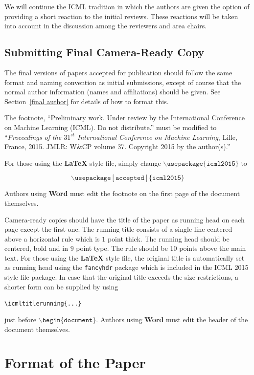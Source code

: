 \documentclass{article}
\begin{document}
We will continue the ICML tradition in which the authors are given the
option of providing a short reaction to the initial reviews. These
reactions will be taken into account in the discussion among the
reviewers and area chairs.

\subsection{Submitting Final Camera-Ready Copy}

The final versions of papers accepted for publication should follow the
same format and naming convention as initial submissions, except of
course that the normal author information (names and affiliations)
should be given.  See Section~\ref{final author} for details of how to
format this.

The footnote, ``Preliminary work.  Under review by the International
Conference on Machine Learning (ICML).  Do not distribute.'' must be
modified to ``\textit{Proceedings of the
$\mathit{31}^{st}$ International Conference on Machine Learning},
Lille, France, 2015.  JMLR: W\&CP volume 37. 
Copyright 2015 by the author(s).''

For those using the \textbf{\LaTeX} style file, simply change
$\mathtt{\backslash usepackage\{icml2015\}}$ to 

$$\mathtt{\backslash usepackage[accepted]\{icml2015\}}$$

\noindent
Authors using \textbf{Word} must edit the
footnote on the first page of the document themselves.

Camera-ready copies should have the title of the paper as running head
on each page except the first one.  The running title consists of a
single line centered above a horizontal rule which is $1$ point thick.
The running head should be centered, bold and in $9$ point type.  The
rule should be $10$ points above the main text.  For those using the
\textbf{\LaTeX} style file, the original title is automatically set as running
head using the {\tt fancyhdr} package which is included in the ICML
2015 style file package.  In case that the original title exceeds the
size restrictions, a shorter form can be supplied by using

\verb|\icmltitlerunning{...}|

just before $\mathtt{\backslash begin\{document\}}$.
Authors using \textbf{Word} must edit the header of the document themselves.

\section{Format of the Paper} 
 
\end{document}
